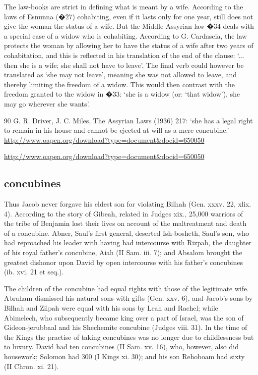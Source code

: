\documentclass[11pt]{article}
\begin{document}
{\begin{thebibliography}{56}
The law-books are strict in defining what is meant by a wife. According to the
laws of Esnunna (�27) cohabiting, even if it lasts only for one year, still does not give the woman the status of a wife. But the Middle Assyrian law �34 deals with
a special case of a widow who is cohabiting. According to G. Cardascia, the law
protects the woman by allowing her to have the status of a wife after two years
of cohabitation, and this is reflected in his translation of the end of the clause:
`... then she is a wife; she shall not have to leave'. The final verb could however
be translated as `she may not leave', meaning she was not allowed to leave,
and thereby limiting the freedom of a widow. This would then contrast with the
freedom granted to the widow in �33: `she is a widow (or: `that widow'), she may
go wherever she wants'.

90 G. R. Driver, J. C. Miles, The Assyrian Laws (1936) 217: ‘she has a legal right to remain in his
house and cannot be ejected at will as a mere concubine.’
\url{http://www.oapen.org/download?type=document&docid=650050}


\url{http://www.oapen.org/download?type=document&docid=650050}




\end{thebibliography}









\subsection{concubines}
Thus Jacob never forgave his eldest son for violating Bilhah (Gen. xxxv. 22, xlix. 4). According to the story of Gibeah, related in Judges xix., 25,000 warriors of the tribe of Benjamin lost their lives on account of the maltreatment and death of a concubine. Abner, Saul's first general, deserted Ish-bosheth, Saul's son, who had reproached his leader with having had intercourse with Rizpah, the daughter of his royal father's concubine, Aiah (II Sam. iii. 7); and Absalom brought the greatest dishonor upon David by open intercourse with his father's concubines (ib. xvi. 21 et seq.).

The children of the concubine had equal rights with those of the legitimate wife. Abraham dismissed his natural sons with gifts (Gen. xxv. 6), and Jacob's sons by Bilhah and Zilpah were equal with his sons by Leah and Rachel; while Abimelech, who subsequently became king over a part of Israel, was the son of Gideon-jerubbaal and his Shechemite concubine (Judges viii. 31). In the time of the Kings the practise of taking concubines was no longer due to childlessness but to luxury. David had ten concubines (II Sam. xv. 16), who, however, also did housework; Solomon had 300 (I Kings xi. 30); and his son Rehoboam had sixty (II Chron. xi. 21).

}
\end{document}
